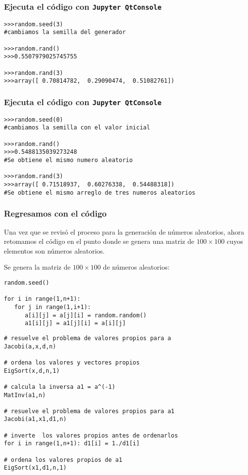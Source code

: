 \begin{frame}[fragile]
\frametitle{Ejecuta el código con \texttt{Jupyter QtConsole}}
\begin{lstlisting}[basicstyle=\linespread{0.9}\ttfamily\normalsize, columns=fullflexible]
>>>random.seed(3)
#cambiamos la semilla del generador

>>>random.rand()
>>>0.5507979025745755

>>>random.rand(3)
>>>array([ 0.70814782,  0.29090474,  0.51082761])
\end{lstlisting}
\end{frame}
\begin{frame}[fragile]
\frametitle{Ejecuta el código con \texttt{Jupyter QtConsole}}
\begin{lstlisting}[basicstyle=\linespread{0.9}\ttfamily\normalsize, columns=fullflexible]
>>>random.seed(0)
#cambiamos la semilla con el valor inicial

>>>random.rand()
>>>0.5488135039273248
#Se obtiene el mismo numero aleatorio

>>>random.rand(3)
>>>array([ 0.71518937,  0.60276338,  0.54488318])
#Se obtiene el mismo arreglo de tres numeros aleatorios
\end{lstlisting}
\end{frame}
\begin{frame}
\frametitle{Regresamos con el código}
Una vez que se revisó el proceso para la generación de números aleatorios, ahora retomamos el código en el punto donde se genera una matriz de $100 \times 100$ cuyos elementos son números aleatorios.
\end{frame}
\begin{frame}[fragile]
Se genera la matriz de $100 \times 100$ de números aleatorios:
\begin{lstlisting}[basicstyle=\linespread{0.9}\ttfamily\normalsize, columns=fullflexible]
random.seed()

for i in range(1,n+1):
   for j in range(1,i+1):
      a[i][j] = a[j][i] = random.random()
      a1[i][j] = a1[j][i] = a[i][j]
\end{lstlisting}
\end{frame}
\begin{frame}[fragile]
\begin{lstlisting}[basicstyle=\linespread{0.9}\ttfamily\normalsize, columns=fullflexible]
# resuelve el problema de valores propios para a
Jacobi(a,x,d,n)

# ordena los valores y vectores propios
EigSort(x,d,n,1)

# calcula la inversa a1 = a^(-1)
MatInv(a1,n)

# resuelve el problema de valores propios para a1
Jacobi(a1,x1,d1,n)

# inverte  los valores propios antes de ordenarlos
for i in range(1,n+1): d1[i] = 1./d1[i]

# ordena los valores propios de a1
EigSort(x1,d1,n,1)
\end{lstlisting}
\end{frame}
